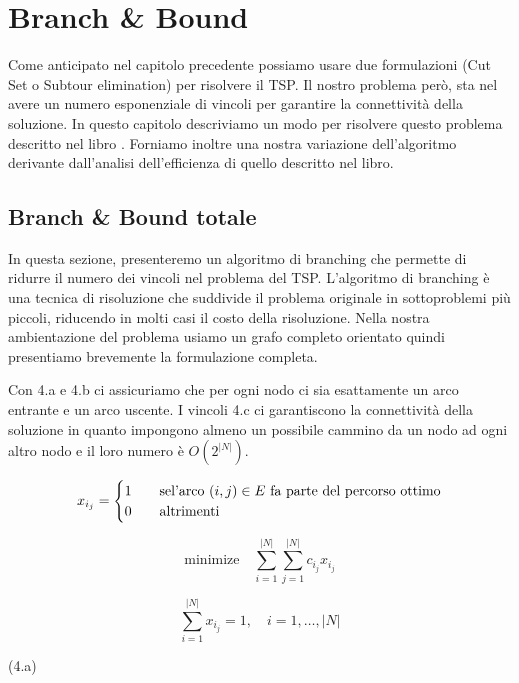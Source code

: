 \chapter{Branch \& Bound}\label{branch_and_bound}

Come anticipato nel capitolo precedente possiamo usare due formulazioni (Cut Set o Subtour elimination) per risolvere il TSP. Il nostro problema però, sta nel avere un numero esponenziale di vincoli per garantire la connettività della soluzione. In questo capitolo descriviamo un modo per risolvere questo problema descritto nel libro \cite{bertsimas}. Forniamo inoltre una nostra variazione dell’algoritmo derivante dall’analisi dell’efficienza di quello descritto nel libro.

\section{Branch \& Bound totale}

In questa sezione, presenteremo un algoritmo di branching che permette di ridurre il numero dei vincoli nel problema del TSP. L'algoritmo di branching è una tecnica di risoluzione che suddivide il problema originale in sottoproblemi più piccoli, riducendo in molti casi il costo della risoluzione. Nella nostra ambientazione del problema usiamo un grafo completo orientato quindi presentiamo brevemente la formulazione completa.

Con 4.a e 4.b ci assicuriamo che per ogni nodo ci sia esattamente un arco entrante e un arco uscente.
I vincoli 4.c ci garantiscono la connettività della soluzione in quanto impongono almeno un possibile cammino da un nodo ad ogni altro nodo e il loro numero è \begin{math}O(2^{|N|})\end{math}.

\[ x_{i_j} =
  \begin{cases}
    1       & \quad \text{se} \text{l'arco \begin{math}(i, j) \in E\end{math} fa parte del percorso ottimo}\\
    0  & \quad \text{altrimenti}
  \end{cases}
\]

\[
\text{minimize} \quad \sum_{i = 1}^{|N|}\sum_{j = 1}^{|N|} c_{i_j} x_{i_j}
\]

\begin{minipage}[t]{0.9\textwidth}
\[
\sum_{i = 1}^{|N|} x_{i_j} = 1, \quad  i = 1, \dots, |N| 
\]
\end{minipage}%
\begin{minipage}[t]{0.1\textwidth}
\vspace{0,4cm}
(4.a)
\end{minipage}


